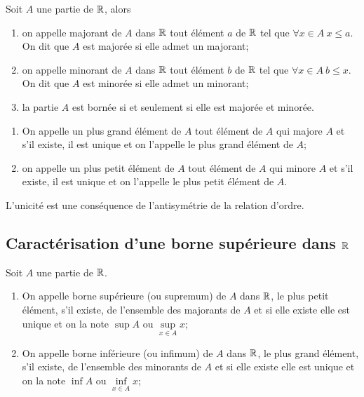 Soit \(A\) une partie de \(\mathbb{R}\), alors
\begin{defdef}
  \begin{enumerate}
    \item on appelle majorant de \(A\) dans \(\mathbb{R}\) tout élément \(a\) de \(\mathbb{R}\) 
      tel que \(\forall x \in A \ x\leqslant a\). On dit que \(A\) est majorée 
      si elle admet un majorant;
    \item on appelle minorant de \(A\) dans \(\mathbb{R}\) tout élément \(b\) de \(\mathbb{R}\) 
      tel que \(\forall x \in A \ b\leqslant x\). On dit que \(A\) est minorée 
      si elle admet un minorant;
    \item la partie \(A\) est bornée si et seulement si elle est majorée et 
      minorée.
  \end{enumerate}
\end{defdef}

\begin{defdef}
  \begin{enumerate}
    \item On appelle un plus grand élément de \(A\) tout élément de \(A\) qui 
      majore \(A\) et s'il existe, il est unique et on l'appelle le plus grand 
      élément de \(A\);
    \item on appelle un plus petit élément de \(A\) tout élément de \(A\) qui 
      minore \(A\) et s'il existe, il est unique et on l'appelle le plus petit 
      élément de \(A\).
  \end{enumerate}
\end{defdef}
L'unicité est une conséquence de l'antisymétrie de la relation d'ordre.

\subsection{Caractérisation d'une borne supérieure dans \(\mathbb{R}\)}

Soit \(A\) une partie de \(\mathbb{R}\).
\begin{defdef}
  \begin{enumerate}
    \item On appelle borne supérieure (ou supremum) de \(A\) dans \(\mathbb{R}\), le 
      plus petit élément, s'il existe, de l'ensemble des majorants de \(A\) et 
      si elle existe elle est unique et on la note \(\sup A\) ou 
      \(\sup\limits_{x\in A} x\);
    \item On appelle borne inférieure (ou infimum) de \(A\) dans \(\mathbb{R}\), le plus 
      grand élément, s'il existe, de l'ensemble des minorants de \(A\) et si 
      elle existe elle est unique et on la note \(\inf A\) ou 
      \(\inf\limits_{x\in A} x\);
  \end{enumerate}
\end{defdef}

